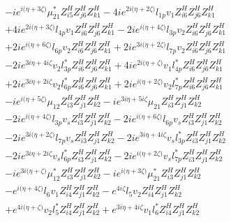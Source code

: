 \begin{align}
 &-i e^{i \Big(\eta +3 \zeta \Big)} \mu_{21}^* Z_{{i 5}}^{H} Z_{{j 6}}^{H} Z_{{k 1}}^{H} -4 i e^{2 i \Big(\eta +2 \zeta \Big)} l_{1p} v_1 Z_{{i 6}}^{H} Z_{{j 6}}^{H} Z_{{k 1}}^{H} \nonumber \\ 
 &+4 i e^{2 i \Big(\eta +3 \zeta \Big)} l_{4p} v_1 Z_{{i 6}}^{H} Z_{{j 6}}^{H} Z_{{k 1}}^{H} -2 i e^{i \Big(\eta +4 \zeta \Big)} l_{3p} v_2 Z_{{i 6}}^{H} Z_{{j 6}}^{H} Z_{{k 1}}^{H} \nonumber \\ 
 &+2 i e^{i \Big(\eta +6 \zeta \Big)} l_{6p} v_2 Z_{{i 6}}^{H} Z_{{j 6}}^{H} Z_{{k 1}}^{H} +2 i e^{3 i \Big(\eta +2 \zeta \Big)} l_{7p} v_2 Z_{{i 6}}^{H} Z_{{j 6}}^{H} Z_{{k 1}}^{H} \nonumber \\ 
 &-2 i e^{3 i \eta +4 i \zeta } v_2 l_{3p}^* Z_{{i 6}}^{H} Z_{{j 6}}^{H} Z_{{k 1}}^{H} +4 i e^{2 i \Big(\eta +\zeta \Big)} v_1 l_{4p}^* Z_{{i 6}}^{H} Z_{{j 6}}^{H} Z_{{k 1}}^{H} \nonumber \\ 
 &+2 i e^{3 i \eta +2 i \zeta } v_2 l_{6p}^* Z_{{i 6}}^{H} Z_{{j 6}}^{H} Z_{{k 1}}^{H} +2 i e^{i \Big(\eta +2 \zeta \Big)} v_2 l_{7p}^* Z_{{i 6}}^{H} Z_{{j 6}}^{H} Z_{{k 1}}^{H} \nonumber \\ 
 &-i e^{i \Big(\eta +5 \zeta \Big)} \mu_{12} Z_{{i 3}}^{H} Z_{{j 1}}^{H} Z_{{k 2}}^{H} -i e^{3 i \eta +5 i \zeta } \mu_{21} Z_{{i 3}}^{H} Z_{{j 1}}^{H} Z_{{k 2}}^{H} \nonumber \\ 
 &-2 i e^{i \Big(\eta +4 \zeta \Big)} l_{3p} v_s Z_{{i 3}}^{H} Z_{{j 1}}^{H} Z_{{k 2}}^{H} -2 i e^{i \Big(\eta +6 \zeta \Big)} l_{6p} v_s Z_{{i 3}}^{H} Z_{{j 1}}^{H} Z_{{k 2}}^{H} \nonumber \\ 
 &-2 i e^{3 i \Big(\eta +2 \zeta \Big)} l_{7p} v_s Z_{{i 3}}^{H} Z_{{j 1}}^{H} Z_{{k 2}}^{H} -2 i e^{3 i \eta +4 i \zeta } v_s l_{3p}^* Z_{{i 3}}^{H} Z_{{j 1}}^{H} Z_{{k 2}}^{H} \nonumber \\ 
 &-2 i e^{3 i \eta +2 i \zeta } v_s l_{6p}^* Z_{{i 3}}^{H} Z_{{j 1}}^{H} Z_{{k 2}}^{H} -2 i e^{i \Big(\eta +2 \zeta \Big)} v_s l_{7p}^* Z_{{i 3}}^{H} Z_{{j 1}}^{H} Z_{{k 2}}^{H} \nonumber \\ 
 &-i e^{3 i \Big(\eta +\zeta \Big)} \mu_{12}^* Z_{{i 3}}^{H} Z_{{j 1}}^{H} Z_{{k 2}}^{H} -i e^{i \Big(\eta +3 \zeta \Big)} \mu_{21}^* Z_{{i 3}}^{H} Z_{{j 1}}^{H} Z_{{k 2}}^{H} \nonumber \\ 
 &- e^{i \Big(\eta +4 \zeta \Big)} l_6 v_1 Z_{{i 4}}^{H} Z_{{j 1}}^{H} Z_{{k 2}}^{H} - e^{4 i \zeta } l_5 v_2 Z_{{i 4}}^{H} Z_{{j 1}}^{H} Z_{{k 2}}^{H} \nonumber \\ 
 &+e^{4 i \Big(\eta +\zeta \Big)} v_2 l_5^* Z_{{i 4}}^{H} Z_{{j 1}}^{H} Z_{{k 2}}^{H} +e^{3 i \eta +4 i \zeta } v_1 l_6^* Z_{{i 4}}^{H} Z_{{j 1}}^{H} Z_{{k 2}}^{H} \nonumber \\ 

\end{align}
